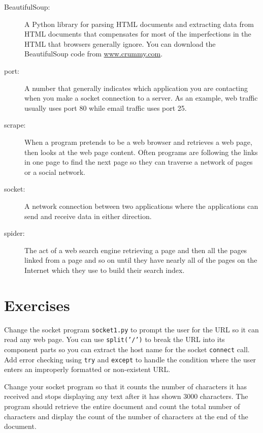 \begin{description}

\item[BeautifulSoup:] A Python library for parsing HTML documents
and extracting data from HTML documents
that compensates for most of the imperfections in the HTML that browsers
generally ignore.
You can download the BeautifulSoup code
from 
\url{www.crummy.com}.

\item[port:] A number that generally indicates which application 
you are contacting when you make a socket connection to a server.
As an example, web traffic usually uses port 80 while email 
traffic uses port 25.

\item[scrape:] When a program pretends to be a web browser and
retrieves a web page, then looks at the web page content. 
Often programs are following the links in one page to find the next
page so they can traverse a network of pages or a social network.

\item[socket:] A network connection between two applications
where the applications can send and receive data in either direction.

\item[spider:] The act of a web search engine retrieving a page and
then all the pages linked from a page and so on until they have 
nearly all of the pages on the Internet which they 
use to build their search index.

\end{description}

\section{Exercises}

\begin{ex}
Change the socket program {\tt socket1.py} to prompt the user for 
the URL so it can read any web page.  
You can use {\tt split('/')} to break the URL into its component parts
so you can extract the host name for the socket {\tt connect} call.
Add error checking using {\tt try} and {\tt except} to handle the condition where the 
user enters an improperly formatted or non-existent URL.  
\end{ex}

\begin{ex}
Change your socket program so that it counts the number of characters it has received 
and stops displaying any text after it has shown 3000 characters.  The program 
should retrieve the entire document and count the total number of characters 
and display the count of the number of characters at the end of the document.
\end{ex}

